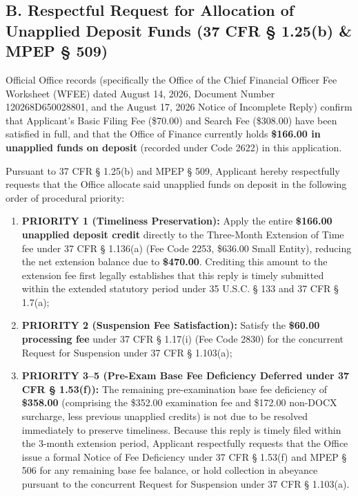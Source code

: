 \documentclass[11pt,letterpaper]{article}
\begin{document}
\subsection*{B. Respectful Request for Allocation of Unapplied Deposit Funds (37 CFR \S{} 1.25(b) \& MPEP \S{} 509)}
Official Office records (specifically the Office of the Chief Financial Officer Fee Worksheet (WFEE) dated August 14, 2026, Document Number 120268D650028801, and the August 17, 2026 Notice of Incomplete Reply) confirm that Applicant's Basic Filing Fee (\$70.00) and Search Fee (\$308.00) have been satisfied in full, and that the Office of Finance currently holds \textbf{\$166.00 in unapplied funds on deposit} (recorded under Code 2622) in this application.

Pursuant to 37 CFR \S{} 1.25(b) and MPEP \S{} 509, Applicant hereby respectfully requests that the Office allocate said unapplied funds on deposit in the following order of procedural priority:
\begin{enumerate}[leftmargin=*]
    \item \textbf{PRIORITY 1 (Timeliness Preservation):} Apply the entire \textbf{\$166.00 unapplied deposit credit} directly to the Three-Month Extension of Time fee under 37 CFR \S{} 1.136(a) (Fee Code 2253, \$636.00 Small Entity), reducing the net extension balance due to \textbf{\$470.00}. Crediting this amount to the extension fee first legally establishes that this reply is timely submitted within the extended statutory period under 35 U.S.C. \S{} 133 and 37 CFR \S{} 1.7(a);
    \item \textbf{PRIORITY 2 (Suspension Fee Satisfaction):} Satisfy the \textbf{\$60.00 processing fee} under 37 CFR \S{} 1.17(i) (Fee Code 2830) for the concurrent Request for Suspension under 37 CFR \S{} 1.103(a);
    \item \textbf{PRIORITY 3--5 (Pre-Exam Base Fee Deficiency Deferred under 37 CFR \S{} 1.53(f)):} The remaining pre-examination base fee deficiency of \textbf{\$358.00} (comprising the \$352.00 examination fee and \$172.00 non-DOCX surcharge, less previous unapplied credits) is not due to be resolved immediately to preserve timeliness. Because this reply is timely filed within the 3-month extension period, Applicant respectfully requests that the Office issue a formal Notice of Fee Deficiency under 37 CFR \S{} 1.53(f) and MPEP \S{} 506 for any remaining base fee balance, or hold collection in abeyance pursuant to the concurrent Request for Suspension under 37 CFR \S{} 1.103(a).
\end{enumerate}
\end{document}
